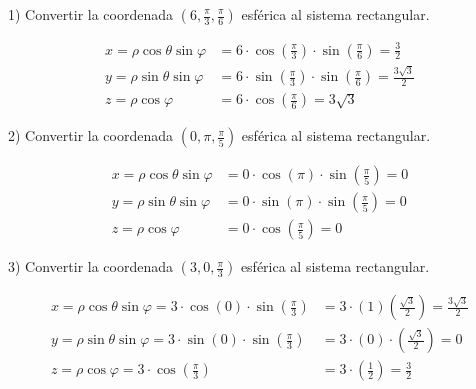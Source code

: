 1) Convertir la coordenada $(6,\frac{\pi}{3},\frac{\pi}{6})$ esférica al sistema rectangular.

\begin{equation*}
  \begin{split}
    x = \rho \cos \theta \sin \varphi &= 6 \cdot \cos \left(\frac{\pi}{3}\right) \cdot \sin \left( \frac{\pi}{6} \right) = \frac{3}{2}\\
    y = \rho \sin \theta \sin \varphi &= 6 \cdot \sin \left( \frac{\pi}{3} \right) \cdot \sin \left(\frac{\pi}{6} \right) =\frac{3\sqrt{3}}{2}\\
    z = \rho \cos \varphi &= 6 \cdot \cos \left(\frac{\pi}{6} \right) = 3 \sqrt{3}
  \end{split}
\end{equation*}

\vspace{4mm}
2) Convertir la coordenada ${\left(0, \pi , \frac{\pi}{5}\right)}$ esférica al sistema rectangular.

\begin{equation*}
  \begin{split}
    x = \rho \cos \theta \sin \varphi &= 0 \cdot \cos \left(\pi\right) \cdot \sin \left(\frac{\pi}{5}\right) = 0\\
    y = \rho \sin \theta \sin \varphi &= 0 \cdot \sin \left(\pi \right) \cdot \sin \left(\frac{\pi}{5} \right) = 0\\
    z = \rho \cos \varphi &= 0 \cdot \cos \left(\frac{\pi}{5} \right) = 0
  \end{split}
\end{equation*}

\vspace{4mm}
3) Convertir la coordenada ${\left(3,0,\frac{\pi}{3} \right)}$ esférica al sistema rectangular.

\begin{equation*}
  \begin{split}
    x = \rho \cos \theta \sin \varphi = 3 \cdot \cos\left(0\right) \cdot \sin \left(\frac{\pi}{3}\right) &= 3 \cdot \left(1\right) \left(\frac{\sqrt{3}}{2} \right) = \frac{3\sqrt{3}}{2}\\
    y = \rho \sin \theta \sin \varphi = 3 \cdot \sin\left(0\right) \cdot \sin \left( \frac{\pi}{3} \right) &= 3 \cdot \left(0\right) \cdot \left(\frac{\sqrt{3}}{2}\right) = 0\\
    z = \rho \cos \varphi = 3 \cdot \cos \left( \frac{\pi}{3}\right) &= 3 \cdot \left(\frac{1}{2}\right) =\frac{3}{2}
  \end{split}
\end{equation*}

